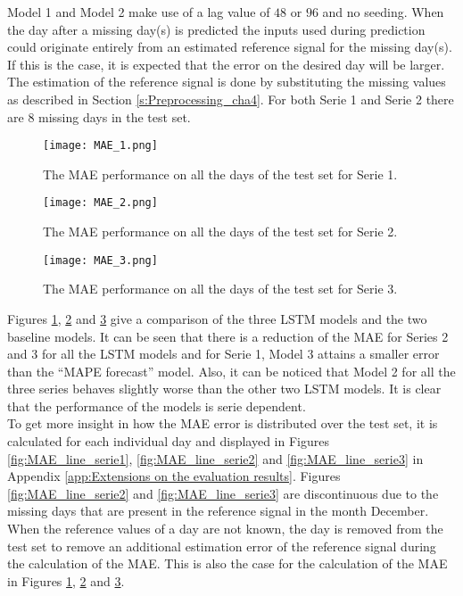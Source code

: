 Model 1 and Model 2 make use of a lag value of $ 48 $ or $ 96 $ and no seeding. When the day after a missing day(s) is predicted the inputs used during prediction could originate entirely from an estimated reference signal for the missing day(s). If this is the case, it is expected that the error on the desired day will be larger. The estimation of the reference signal is done by substituting the missing values as described in Section \ref{s:Preprocessing_cha4}. For both Serie 1 and Serie 2 there are $ 8 $ missing days in the test set.

\begin{figure}[h]
	\centering
	\texttt{[image: MAE\_1.png]}
	\caption{The MAE performance on all the days of the test set for Serie 1.}
	\label{fig:MAE_serie1}
\end{figure}

\begin{figure}[h]
	\centering
	\texttt{[image: MAE\_2.png]}
	\caption{The MAE performance on all the days of the test set for Serie 2.}
	\label{fig:MAE_serie2}
\end{figure}	

\begin{figure}[h]
	\centering
	\texttt{[image: MAE\_3.png]}
	\caption{The MAE performance on all the days of the test set for Serie 3.}
	\label{fig:MAE_serie3}
\end{figure}	

Figures \ref{fig:MAE_serie1}, \ref{fig:MAE_serie2} and \ref{fig:MAE_serie3} give a comparison of the three LSTM models and the two baseline models. It can be seen that there is a reduction of the MAE for Series 2 and 3 for all the LSTM models and for Serie 1, Model 3 attains a smaller error than the ``MAPE forecast'' model. Also, it can be noticed that Model 2 for all the three series behaves slightly worse than the other two LSTM models. It is clear that the performance of the models is serie dependent.\\

To get more insight in how the MAE error is distributed over the test set, it is calculated for each individual day and displayed in Figures \ref{fig:MAE_line_serie1}, \ref{fig:MAE_line_serie2} and \ref{fig:MAE_line_serie3} in Appendix \ref{app:Extensions on the evaluation results}. Figures \ref{fig:MAE_line_serie2} and \ref{fig:MAE_line_serie3} are discontinuous due to the missing days that are present in the reference signal in the month December. When the reference values of a day are not known, the day is removed from the test set to remove an additional estimation error of the reference signal during the calculation of the MAE. This is also the case for the calculation of the MAE in Figures \ref{fig:MAE_serie1}, \ref{fig:MAE_serie2} and \ref{fig:MAE_serie3}. \\

